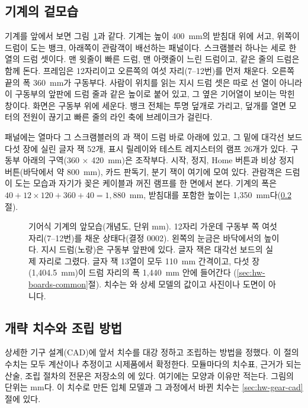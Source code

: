 \subsection{기계의 겉모습}

기계를 앞에서 보면 그림~\ref{fig:hw-gear-front}과 같다. 기계는 높이 400~mm의 받침대 위에 서고, 위쪽이 드럼이
도는 뱅크, 아래쪽이 관람객이 배선하는 패널이다. 스크램블러 하나는 세로 한 열의 드럼 셋이다. 맨 윗줄이 빠른
드럼, 맨 아랫줄이 느린 드럼이고, 같은 줄의 드럼은 함께 돈다. 프레임은 12자리이고 오른쪽의 여섯 자리(7--12번)를
먼저 채운다. 오른쪽 끝의 폭 360~mm가 구동부다. 사람이 위치를 읽는 지시 드럼 셋은 따로 선 열이 아니라 이 구동부의
앞판에 드럼 줄과 같은 높이로 붙어 있고, 그 옆은 기어열이 보이는 막힌 창이다. 화면은 구동부 위에 세운다. 뱅크
전체는 투명 덮개로 가리고, 덮개를 열면 모터의 전원이 끊기고 빠른 줄의 라인 축에 브레이크가 걸린다.

패널에는 열마다 그 스크램블러의 과  잭이 드럼 바로 아래에 있고, 그 밑에 대각선 보드 다섯 장에
실린 글자 잭 52개, 표시 릴레이와 테스트 레지스터의 램프 26개가 있다. 구동부 아래의 구역(360 $\times$ 420~mm)은
조작부다. 시작, 정지, Home 버튼과 비상 정지 버튼(바닥에서 약 800~mm), 카드 판독기, 분기 잭이 여기에 모여 있다.
관람객은 드럼이 도는 모습과 자기가 꽂은 케이블과 꺼진 램프를 한 면에서 본다. 기계의 폭은
$40 + 12 \times 120 + 360 + 40 = 1{,}880$~mm, 받침대를 포함한 높이는 1,350~mm다(\ref{sec:hw-gear-layout}절).

\begin{figure}[ht]
\centering

\caption{기어식 기계의 앞모습(개념도, 단위 mm). 12자리 가운데 구동부 쪽 여섯 자리(7--12번)를 채운 상태다(결정
0002). 왼쪽의 눈금은 바닥에서의 높이다. 지시 드럼(노랑)은 구동부 앞판에 있다. 글자 잭은 대각선 보드의 실제 자리로 그렸다.
글자 잭 13열이 모두 110~mm 간격이고, 다섯 장(1,404.5~mm)이 드럼 자리의 폭 1,440~mm 안에 들어간다
(\ref{sec:hw-boards-common}절). 치수는
와 상세 모델의 값이고 사진이나 도면이 아니다.}
\label{fig:hw-gear-front}
\end{figure}

\subsection{개략 치수와 조립 방법}\label{sec:hw-gear-layout}

상세한 기구 설계(CAD)에 앞서 치수를 대강 정하고 조립하는 방법을 정했다. 이 절의 수치는 모두 계산이나 추정이고
시제품에서 확정한다. 모듈마다의 치수표, 근거가 되는 산술, 조립 절차의 전문은 저장소의
에 있다. 여기에는 모양과 이유만 적는다. 그림의 단위는 mm다. 이 치수로 만든
입체 모델과 그 과정에서 바뀐 치수는 \ref{sec:hw-gear-cad}절에 있다.

